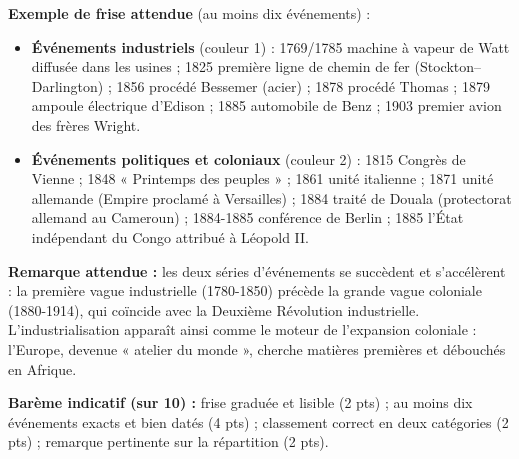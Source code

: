 \documentclass[11pt]{article}
\begin{document}
\begin{corrige}
\textbf{Exemple de frise attendue} (au moins dix événements) :
\begin{itemize}
\item \textbf{Événements industriels} (couleur 1) : 1769/1785 machine à vapeur de Watt diffusée dans les usines ; 1825 première ligne de chemin de fer (Stockton--Darlington) ; 1856 procédé Bessemer (acier) ; 1878 procédé Thomas ; 1879 ampoule électrique d'Edison ; 1885 automobile de Benz ; 1903 premier avion des frères Wright.
\item \textbf{Événements politiques et coloniaux} (couleur 2) : 1815 Congrès de Vienne ; 1848 « Printemps des peuples » ; 1861 unité italienne ; 1871 unité allemande (Empire proclamé à Versailles) ; 1884 traité de Douala (protectorat allemand au Cameroun) ; 1884-1885 conférence de Berlin ; 1885 l'État indépendant du Congo attribué à Léopold II.
\end{itemize}
\textbf{Remarque attendue :} les deux séries d'événements se succèdent et s'accélèrent : la première vague industrielle (1780-1850) précède la grande vague coloniale (1880-1914), qui coïncide avec la Deuxième Révolution industrielle. L'industrialisation apparaît ainsi comme le moteur de l'expansion coloniale : l'Europe, devenue « atelier du monde », cherche matières premières et débouchés en Afrique.
\par\medskip
\textbf{Barème indicatif (sur 10) :} frise graduée et lisible (2 pts) ; au moins dix événements exacts et bien datés (4 pts) ; classement correct en deux catégories (2 pts) ; remarque pertinente sur la répartition (2 pts).
\end{corrige}
\end{document}
